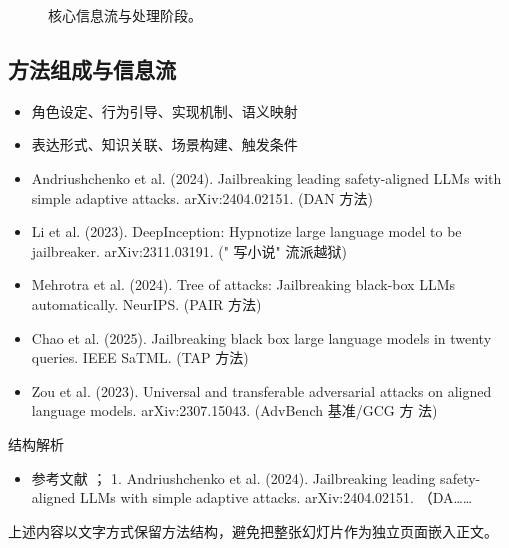\documentclass[UTF8,11pt,a4paper]{ctexart}
\begin{document}
\begin{figure}[H]
\centering
{}
\caption{核心信息流与处理阶段。}
\end{figure}

\subsection{方法组成与信息流}
\begin{itemize}
\item 角色设定、行为引导、实现机制、语义映射
\item 表达形式、知识关联、场景构建、触发条件
\item Andriushchenko et al. (2024). Jailbreaking leading safety-aligned LLMs with simple adaptive attacks. arXiv:2404.02151. (DAN 方法)
\item Li et al. (2023). DeepInception: Hypnotize large language model to be jailbreaker. arXiv:2311.03191. (" 写小说" 流派越狱)
\item Mehrotra et al. (2024). Tree of attacks: Jailbreaking black-box LLMs automatically. NeurIPS. (PAIR 方法)
\item Chao et al. (2025). Jailbreaking black box large language models in twenty queries. IEEE SaTML. (TAP 方法)
\item Zou et al. (2023). Universal and transferable adversarial attacks on aligned language models. arXiv:2307.15043. (AdvBench 基准/GCG 方 法)
\end{itemize}

\begin{keybox}{结构解析}
\begin{itemize}
\item 参考文献 ； 1. Andriushchenko et al. (2024). Jailbreaking leading safety-aligned LLMs with simple adaptive attacks. arXiv:2404.02151. （DA……
\end{itemize}
\end{keybox}

上述内容以文字方式保留方法结构，避免把整张幻灯片作为独立页面嵌入正文。
\end{document}
